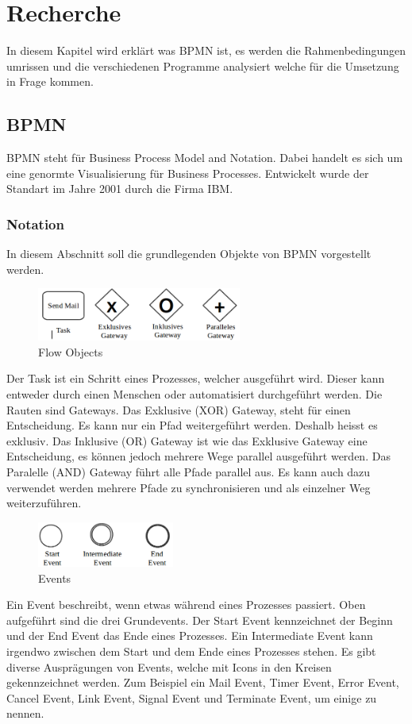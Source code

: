 \chapter{Recherche}

In diesem Kapitel wird erklärt was BPMN ist, es werden die Rahmenbedingungen umrissen und die verschiedenen Programme analysiert welche für die Umsetzung in Frage kommen.

\section{BPMN}
BPMN steht für Business Process Model and Notation. Dabei handelt es sich um eine genormte Visualisierung für Business Processes. Entwickelt wurde der Standart im Jahre 2001 durch die Firma IBM.

\subsection{Notation}
\label{sec:Recherche:bpmn:notation}
In diesem Abschnitt soll die grundlegenden Objekte von BPMN vorgestellt werden.

\begin{figure}[H]
	\centering
	\includegraphics[width=0.6\textwidth]{images/bpmn-flow-objects.png}
	\caption{Flow Objects}
	\label{fig:recherche:bpmn:flowobjects}
\end{figure}
Der Task ist ein Schritt eines Prozesses, welcher ausgeführt wird. Dieser kann entweder durch einen Menschen oder automatisiert durchgeführt werden. Die Rauten sind Gateways. Das Exklusive (XOR) Gateway, steht für einen Entscheidung. Es kann nur ein Pfad weitergeführt werden. Deshalb heisst es exklusiv. Das Inklusive (OR) Gateway ist wie das Exklusive Gateway eine Entscheidung, es können jedoch mehrere Wege parallel ausgeführt werden. Das Paralelle (AND) Gateway führt alle Pfade parallel aus. Es kann auch dazu verwendet werden mehrere Pfade zu synchronisieren und als einzelner Weg weiterzuführen.

\begin{figure}[H]
	\centering
	\includegraphics[width=0.4\textwidth]{images/bpmn-flow-objects2.png}
	\caption{Events}
	\label{fig:recherche:bpmn:events}
\end{figure}
Ein Event beschreibt, wenn etwas während eines Prozesses passiert. Oben aufgeführt sind die drei Grundevents. Der Start Event kennzeichnet der Beginn und der End Event das Ende eines Prozesses. Ein Intermediate Event kann irgendwo zwischen dem Start und dem Ende eines Prozesses stehen. Es gibt diverse Ausprägungen von Events, welche mit Icons in den Kreisen gekennzeichnet werden. Zum Beispiel ein Mail Event, Timer Event, Error Event, Cancel Event, Link Event, Signal Event und Terminate Event, um einige zu nennen.

